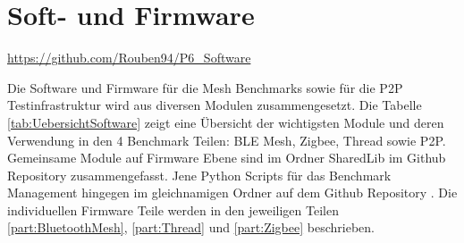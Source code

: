 \clearpage
\section{Soft- und Firmware}\label{sec:Soft-undFirmware}
\url{https://github.com/Rouben94/P6_Software}

Die Software und Firmware für die Mesh Benchmarks sowie für die P2P Testinfrastruktur wird aus diversen Modulen zusammengesetzt. Die Tabelle \ref{tab:UebersichtSoftware} zeigt eine Übersicht der wichtigsten Module und deren Verwendung in den 4 Benchmark Teilen: BLE Mesh, Zigbee, Thread sowie P2P.
Gemeinsame Module auf Firmware Ebene sind im Ordner SharedLib im Github Repository zusammengefasst. Jene Python Scripts für das Benchmark Management hingegen im gleichnamigen Ordner auf dem Github Repository \cite{anklin_bobst_horath_rouben94p6_software_nodate}.
Die individuellen Firmware Teile werden in den jeweiligen Teilen \ref{part:BluetoothMesh}, \ref{part:Thread} und \ref{part:Zigbee} beschrieben.



